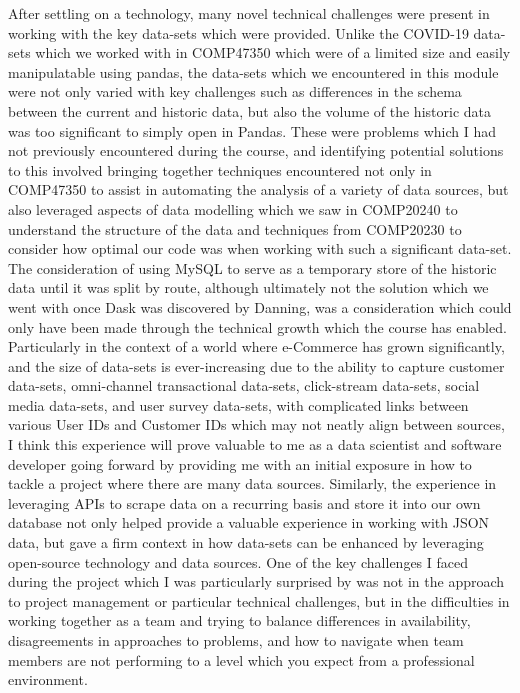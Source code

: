 \documentclass{scrreprt}
\begin{document}
After settling on a technology, many novel technical challenges were present in working with the key data-sets which were provided. Unlike the COVID-19 data-sets which we worked with in COMP47350 which were of a limited size and easily manipulatable using pandas, the data-sets which we encountered in this module were not only varied with key challenges such as differences in the schema between the current and historic data, but also the volume of the historic data was too significant to simply open in Pandas. These were problems which I had not previously encountered during the course, and identifying potential solutions to this involved bringing together techniques encountered not only in COMP47350 to assist in automating the analysis of a variety of data sources, but also leveraged aspects of data modelling which we saw in COMP20240 to understand the structure of the data and techniques from COMP20230 to consider how optimal our code was when working with such a significant data-set. The consideration of using MySQL to serve as a temporary store of the historic data until it was split by route, although ultimately not the solution which we went with once Dask was discovered by Danning, was a consideration which could only have been made through the technical growth which the course has enabled. Particularly in the context of a world where e-Commerce has grown significantly, and the size of data-sets is ever-increasing due to the ability to capture customer data-sets, omni-channel transactional data-sets, click-stream data-sets, social media data-sets, and user survey data-sets, with complicated links between various User IDs and Customer IDs which may not neatly align between sources, I think this experience will prove valuable to me as a data scientist and software developer going forward by providing me with an initial exposure in how to tackle a project where there are many data sources. Similarly, the experience in leveraging APIs to scrape data on a recurring basis and store it into our own database not only helped provide a valuable experience in working with JSON data, but gave a firm context in how data-sets can be enhanced by leveraging open-source technology and data sources. 
\newline
\newline
\noindent One of the key challenges I faced during the project which I was particularly surprised by was not in the approach to project management or particular technical challenges, but in the difficulties in working together as a team and trying to balance differences in availability, disagreements in approaches to problems, and how to navigate when team members are not performing to a level which you expect from a professional environment.
\end{document}
